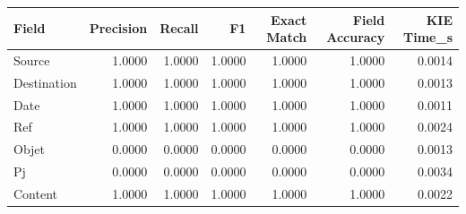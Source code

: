 \begin{tabular}{lrrrrrr}
\toprule
Field & Precision & Recall & F1 & Exact Match & Field Accuracy & KIE Time_s \\
\midrule
Source & 1.0000 & 1.0000 & 1.0000 & 1.0000 & 1.0000 & 0.0014 \\
Destination & 1.0000 & 1.0000 & 1.0000 & 1.0000 & 1.0000 & 0.0013 \\
Date & 1.0000 & 1.0000 & 1.0000 & 1.0000 & 1.0000 & 0.0011 \\
Ref & 1.0000 & 1.0000 & 1.0000 & 1.0000 & 1.0000 & 0.0024 \\
Objet & 0.0000 & 0.0000 & 0.0000 & 0.0000 & 0.0000 & 0.0013 \\
Pj & 0.0000 & 0.0000 & 0.0000 & 0.0000 & 0.0000 & 0.0034 \\
Content & 1.0000 & 1.0000 & 1.0000 & 1.0000 & 1.0000 & 0.0022 \\
\bottomrule
\end{tabular}
